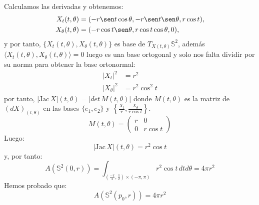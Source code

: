 \begin{remark}
Calculamos las derivadas y obtenemos:
%
\begin{align*}
    X_t(t, \theta) &= (-r\sen t\cos\theta, -r\sen t\sen\theta, r\cos t), \\
    X_\theta(t, \theta) &= (-r\cos t\sen\theta, r\cos t\cos\theta, 0),
\end{align*}
%
y por tanto, $\{ X_t(t, \theta), X_\theta(t, \theta) \}$ es base de $T_{X(t,\theta)} \mathbb{S}^2$, además $\langle X_t(t, \theta), X_\theta(t, \theta) \rangle = 0$ luego es una base ortogonal y solo nos falta dividir por su norma para obtener la base ortonormal:
%
\begin{align*}
    |X_t|^2 &= r^2 \\
    |X_\theta|^2 &= r^2\cos^2t
\end{align*}
%
por tanto, $|\text{Jac} \, X|(t,\theta) = |det \, M(t,\theta)|$  donde $M(t,\theta)$ es la matriz de $(dX)_{(t, \theta)}$ en las bases $\{e_1, e_2\}$ y $\left\{ \frac{X_t}{r}, \frac{X_\theta}{r\cos t} \right\}$.
%
\begin{equation*}
    M(t,\theta) = \left( {\begin{array}{cc}
        r & 0 \\
        0 & r\cos t
    \end{array} } \right)
\end{equation*}
%
Luego:
%
\begin{equation*}
    |\text{Jac} \, X|(t,\theta) = r^2\cos t
\end{equation*}
%
y, por tanto:
%
\begin{equation*}
    A(\mathbb{S}^2(0,r)) = \int_{(\frac{-\pi}{2}, \frac{\pi}{2}) \times (-\pi, \pi)} r^2\cos t \, dtd\theta = 4\pi r^2 
\end{equation*}
%
Hemos probado que:
\begin{equation*}
    A(\mathbb{S}^2(p_0,r)) = 4\pi r^2 
\end{equation*}
\end{remark}


